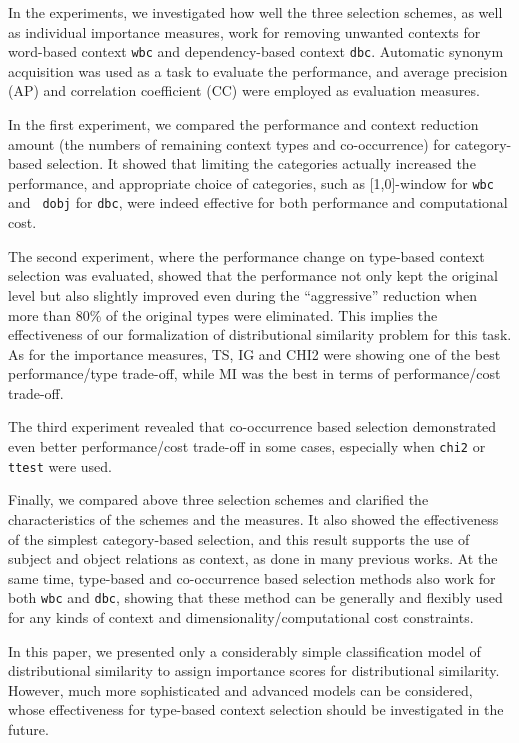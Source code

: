 \documentclass[english]{jnlp_1.4}
\begin{document}
In the experiments, we investigated how well the three selection
schemes, as well as individual importance measures, work for removing
unwanted contexts for word-based context {\tt wbc} and
dependency-based context {\tt dbc}. Automatic synonym acquisition was
used as a task to evaluate the performance, and average precision (AP)
and correlation coefficient (CC) were employed as evaluation measures.

In the first experiment, we compared the performance and context
reduction amount (the numbers of remaining context types and
co-occurrence) for category-based selection. It showed that limiting
the categories actually increased the performance, and appropriate
choice of categories, such as [1,0]-window for {\tt wbc} and {\tt
dobj} for {\tt dbc}, were indeed effective for both performance and
computational cost.

The second experiment, where the performance change on type-based
context selection was evaluated, showed that the performance not only
kept the original level but also slightly improved even during the
``aggressive'' reduction when more than 80\% of the original types
were eliminated. This implies the effectiveness of our formalization of
distributional similarity problem for this task.  As for the importance
measures, TS, IG and CHI2 were showing one of the best
performance/type trade-off, while MI was the best in terms of
performance/cost trade-off.

The third experiment revealed that co-occurrence based selection
demonstrated even better performance/cost trade-off in some cases,
especially when {\tt chi2} or {\tt ttest} were used.

Finally, we compared above three selection schemes and clarified the
characteristics of the schemes and the measures. It also showed the
effectiveness of the simplest category-based selection, and this
result supports the use of subject and object relations as context, as
done in many previous works. At the same time, type-based
and co-occurrence based selection methods also work for both {\tt wbc}
and {\tt dbc}, showing that these method can be generally and flexibly
used for any kinds of context and dimensionality/computational cost
constraints.



In this paper, we presented only a considerably simple classification
model of distributional similarity to assign importance scores for
distributional similarity. However, much more sophisticated and
advanced models can be considered, whose effectiveness for type-based
context selection should be investigated in the future.
\end{document}
